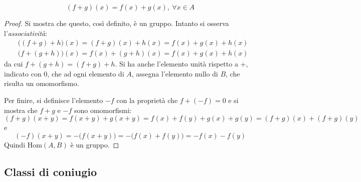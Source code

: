 \documentclass[11pt, a4paper]{scrartcl}
\theoremstyle{definition}
\numberwithin{esempio}{section}
\theoremstyle{definition}
\numberwithin{obs}{section}
\numberwithin{nota}{section}
\numberwithin{equation}{subsection}
\begin{document}
 \[
	 (f+g) (x) = f(x) + g(x), \ \forall x \in A
 \] 
\begin{proof}
	Si mostra che questo, cos\`i definito, \`e un gruppo. Intanto si osserva l'\textit{associativit\`a}:
	\[
	\begin{split}
		&\big( (f+g) + h\big)(x) = (f+g) (x) + h(x) = f(x) + g(x) + h(x)\\
		&\big(f + (g+h)\big)(x) = f(x) + (g+h) (x) = f(x) + g(x) +h(x)
	\end{split}
	\] 
da cui $f + (g+h) = (f+g) +h$. 
Si ha anche l'elemento unit\`a rispetto a $+$, indicato con $0$, che ad ogni elemento di $A$, assegna l'elemento nullo di $B$, che risulta un omomorfismo. 

Per finire, si definisce l'elemento $-f$ con la propriet\`a che $f + (-f) = 0$ e si mostra che $f+g$ e $-f$ sono omomorfismi:
\[
		(f+g) (x+y) = f(x+y) + g(x+y) = f(x) + f(y) + g(x) + g(y) = (f+g) (x) + (f+g) (y)
\] 
e 
\[
	(-f)(x+y) = -\big(f(x+y) \big)= - \big(f(x) + f(y)\big) = - f(x) - f(y)
\] 
Quindi $\mathrm{Hom}(A,B) $ \`e un gruppo.
\end{proof} 
\subsection{Classi di coniugio}
\end{document}
